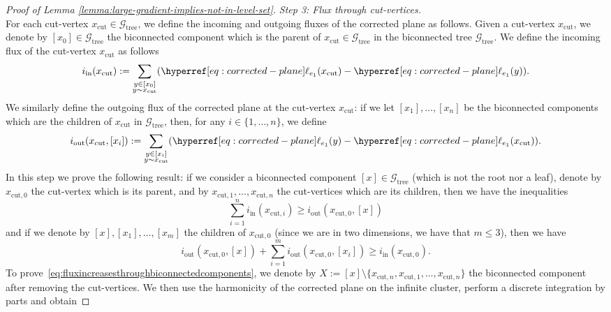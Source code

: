 \documentclass[12pt]{amsart}
\numberwithin{equation}{section}
\begin{document}
\begin{proof}[Proof of Lemma \ref{lemma:large-gradient-implies-not-in-level-set}]
		{\it Step 3: Flux through cut-vertices.} \\ 
		For each cut-vertex $x_{\mathrm{cut}} \in \mathcal{G}_{\mathrm{tree}}$, we define the incoming and outgoing fluxes of the corrected plane as follows. Given a cut-vertex $x_{\mathrm{cut}}$, we denote by $[x_0] \in \mathcal{G}_{\mathrm{tree}}$ the biconnected component which is the parent of $x_{\mathrm{cut}} \in \mathcal{G}_{\mathrm{tree}}$ in the biconnected tree $\mathcal{G}_{\mathrm{tree}}$. We define the incoming flux of the cut-vertex $x_{\mathrm{cut}}$ as follows
		\begin{equation*}
			i_{\mathrm{in}}(x_{\mathrm{cut}}) := \sum_{\substack{y \in [x_0]  \\ y \sim x_{\mathrm{cut}}}} (\ellp{e_1}(x_{\mathrm{cut}}) - \ellp{e_1}(y)). 
		\end{equation*}
		We similarly define the outgoing flux of the corrected plane at the cut-vertex $x_{\mathrm{cut}}$: if we let $[x_1], \ldots, [x_n]$ be the biconnected components which are the children of  $x_{\mathrm{cut}}$ in $\mathcal{G}_{\mathrm{tree}}$, then, for any $i \in \{ 1 , \ldots , n\}$, we define
		\begin{equation*}
			i_{\mathrm{out}}(x_{\mathrm{cut}}, [x_i]) := \sum_{\substack{ y \in [x_i] \\ y \sim x_{\mathrm{cut}}}} (\ellp{e_1}(y) - \ellp{e_1}(x_{\mathrm{cut}})).
		\end{equation*}
		In this step we prove the following result: if we consider a biconnected component $[x] \in \mathcal{G}_{\mathrm{tree}}$ (which is not the root nor a leaf), denote by $x_{\mathrm{cut},0}$ the cut-vertex which is its parent, and by $x_{\mathrm{cut},1} , \ldots, x_{\mathrm{cut},n}$ the cut-vertices which are its children, then we have the inequalities
		\begin{equation} \label{eq:fluxincreasesthroughbiconnectedcomponents}
			\sum_{i = 1}^n i_{\mathrm{in}}(x_{\mathrm{cut} , i}) \geq i_{\mathrm{out}}(x_{\mathrm{cut} , 0}, [x]) 
		\end{equation}
		and if we denote by $[x], [x_1], \ldots, [x_m]$ the children of $x_{\mathrm{cut},0}$ (since we are in two dimensions, we have that $m \leq 3$), then we have
		\begin{equation}\label{eq:fluxincreasesthroughbiconnectedcomponents2}
			i_{\mathrm{out}}(x_{\mathrm{cut} , 0}, [x]) + \sum_{i=1}^m i_{\mathrm{out}}(x_{\mathrm{cut} , 0}, [x_i]) \geq i_{\mathrm{in}}(x_{\mathrm{cut} , 0}).
		\end{equation}
		To prove~\eqref{eq:fluxincreasesthroughbiconnectedcomponents}, we denote by $X := [x] \setminus \{ x_{\mathrm{cut},n}, x_{\mathrm{cut},1} , \ldots, x_{\mathrm{cut},n} \}$ the biconnected component after removing the cut-vertices. We then use the harmonicity of the corrected plane on the infinite cluster, perform a discrete integration by parts and obtain

\end{proof}
\end{document}
